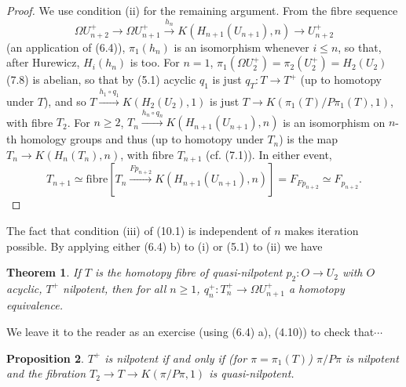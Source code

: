 \documentclass[openany,leqno]{book}  %
\newtheorem{theorem}{Theorem}[chapter]
\newtheorem{prop}[theorem]{Proposition}
\begin{document}
\begin{proof}
We use condition (ii) for the remaining argument. From the fibre sequence 
$$\Omega U_{n+2}^+\longrightarrow \Omega U_{n+1}^+ \overset{h_n}{\longrightarrow} K(H_{n+1}(U_{n+1}),n) \longrightarrow U_{n+2}^+$$
(an application of (6.4)), $\pi_1(h_n)$ is an isomorphism whenever $i \leqslant n$, so that, after Hurewicz,
$H_i(h_n)$ is too. For $n = 1$, $\pi_1 (\Omega U_{2}^+) = \pi_2(U_{2}^+) = H_2(U_2)$ (7.8) is abelian, so that by (5.1) acyclic $q_1$ is just $q_T \colon   T \longrightarrow T^+$ (up to homotopy under $T$), and so $T \overset{h_1\circ q_1}{\longrightarrow} K(H_2(U_2), 1)$ is just $T \longrightarrow K(\pi_1(T)/P\pi_1(T), 1)$, with fibre $T_2$. For $n \geqslant 2$, $T_n\overset{h_n\circ q_n}{\longrightarrow} K(H_{n+1 }(U_{n+1} ),n)$ is an isomorphism
on $n$-th homology groups and thus (up to homotopy under $T_n$) is the map $T_n \longrightarrow K(H_n(T_n), n)$, with fibre $T_{n+1}$ (cf. (7.1)). In either event,
\[T_{n+1} \simeq \mbox{fibre} [T_n \overset{Fp_{n+2}}{\longrightarrow} K(H_{n+1}(U_{n+1}),n)]= F_{Fp_{n+2}} \simeq F_{p_{n+2}}.\]
\end{proof}
The fact that condition (iii) of (10.1) is independent of $n$ makes iteration possible. By applying either (6.4) b) to (i) or (5.1) to (ii) we have
\begin{theorem}
If $T$ is the homotopy fibre of quasi-nilpotent $p_2\colon   O\longrightarrow U_2$ with $O$ acyclic, $T^+$ nilpotent, then for all $n \geqslant 1$, $q_n^+\colon  T_n^+\longrightarrow \Omega U_{n+1}^+$ a homotopy equivalence.
\end{theorem}

We leave it to the reader as an exercise (using (6.4) a), (4.10)) to check that$\cdots $

\begin{prop}
 	$T^+$ is nilpotent if and only if (for $\pi= \pi_1(T)$) $\pi/P\pi$ is nilpotent and the fibration $T_2 \longrightarrow  T \longrightarrow  K(\pi/P\pi, 1)$ is quasi-nilpotent.
 \end{prop} 
\end{document}
